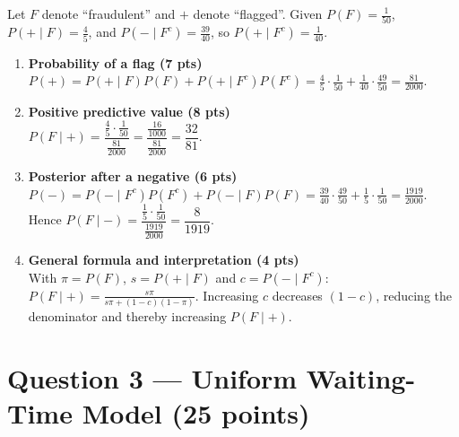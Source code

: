 \documentclass[11pt]{article}
\begin{document}
Let $F$ denote ``fraudulent'' and $+$ denote ``flagged''. Given $P(F)=\tfrac{1}{50}$, $P(+\mid F)=\tfrac{4}{5}$, and $P(-\mid F^c)=\tfrac{39}{40}$, so $P(+\mid F^c)=\tfrac{1}{40}$.

\begin{enumerate}
  \item \textbf{Probability of a flag (7 pts)}\\
  $P(+) = P(+\mid F)P(F) + P(+\mid F^c)P(F^c) = \tfrac{4}{5}\cdot\tfrac{1}{50} + \tfrac{1}{40}\cdot\tfrac{49}{50} = \tfrac{81}{2000}$.

  \item \textbf{Positive predictive value (8 pts)}\\
  $P(F\mid +) = \dfrac{\tfrac{4}{5}\cdot\tfrac{1}{50}}{\tfrac{81}{2000}} = \dfrac{\tfrac{16}{1000}}{\tfrac{81}{2000}} = \dfrac{32}{81}$.

  \item \textbf{Posterior after a negative (6 pts)}\\
  $P(-) = P(-\mid F^c)P(F^c) + P(-\mid F)P(F) = \tfrac{39}{40}\cdot\tfrac{49}{50} + \tfrac{1}{5}\cdot\tfrac{1}{50} = \tfrac{1919}{2000}$. Hence $P(F\mid -) = \dfrac{\tfrac{1}{5}\cdot\tfrac{1}{50}}{\tfrac{1919}{2000}} = \dfrac{8}{1919}$.

  \item \textbf{General formula and interpretation (4 pts)}\\
  With $\pi=P(F)$, $s=P(+\mid F)$ and $c=P(-\mid F^c)$: $\displaystyle P(F\mid +) = \frac{s\pi}{s\pi + (1-c)(1-\pi)}$. Increasing $c$ decreases $(1-c)$, reducing the denominator and thereby increasing $P(F\mid +)$.
\end{enumerate}

\section*{Question 3 — Uniform Waiting-Time Model (25 points)}
\end{document}
